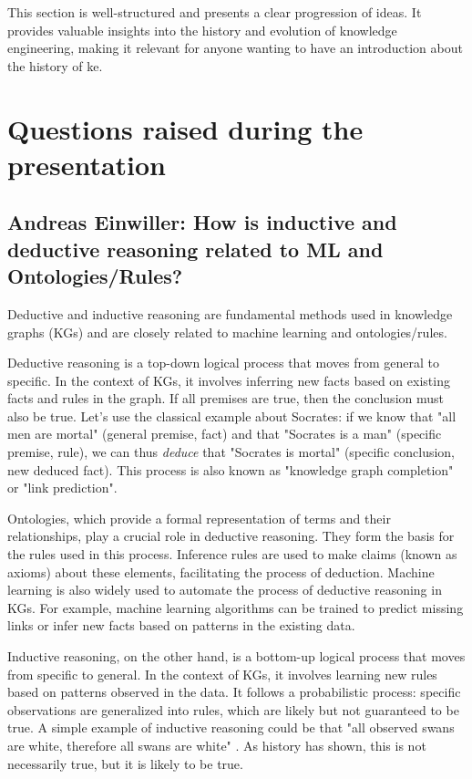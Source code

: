 \documentclass[11pt]{article} %
\begin{document}
This section is well-structured and presents a clear progression of ideas. It provides valuable insights into the history and evolution of knowledge engineering, making it relevant for anyone wanting to have an introduction about the history of \acrshort{ke}. 

\section{Questions raised during the presentation}

\subsection{Andreas Einwiller: How is inductive and deductive reasoning related to ML and Ontologies/Rules?}

Deductive and inductive reasoning are fundamental methods used in knowledge graphs (KGs) and are closely related to machine learning and ontologies/rules.

Deductive reasoning is a top-down logical process that moves from general to specific. In the context of KGs, it involves inferring new facts based on existing facts and rules in the graph. If all premises are true, then the conclusion must also be true. Let's use the classical example about Socrates: if we know that "all men are mortal" (general premise, fact) and that "Socrates is a man" (specific premise, rule), we can thus \textit{deduce} that "Socrates is mortal" (specific conclusion, new deduced fact). This process is also known as "knowledge graph completion" or "link prediction". 

Ontologies, which provide a formal representation of terms and their relationships, play a crucial role in deductive reasoning. They form the basis for the rules used in this process. Inference rules are used to make claims (known as axioms) about these elements, facilitating the process of deduction. Machine learning is also widely used to automate the process of deductive reasoning in KGs. For example, machine learning algorithms can be trained to predict missing links or infer new facts based on patterns in the existing data.

Inductive reasoning, on the other hand, is a bottom-up logical process that moves from specific to general. In the context of KGs, it involves learning new rules based on patterns observed in the data. It follows a probabilistic process: specific observations are generalized into rules, which are likely but not guaranteed to be true. A simple example of inductive reasoning could be that "all observed swans are white, therefore all swans are white" \cite{hulme1902proverb}. As history has shown, this is not necessarily true, but it is likely to be true. 
\end{document}
